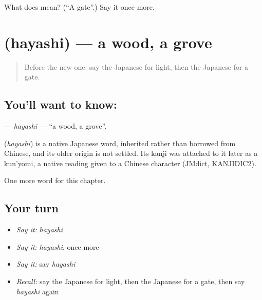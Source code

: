 \begin{tcolorbox}[breakable,colback=teal!4,colframe=teal!35!black,title={Before you move on}]
What does  mean? (\textquotedblleft{}A gate\textquotedblright{}.) Say it once more.
\end{tcolorbox}
\section[\texorpdfstring{\ja{はやし} (hayashi)}{はやし (hayashi)}]{ (hayashi) — a wood, a grove}

\label{lesson:JA-C106-hayashi}



\begin{quote}
Before the new one: say the Japanese for light, then the Japanese for a gate.
\end{quote}

\subsection*{You'll want to know: }
\textbf{} — \emph{hayashi} — \textquotedblleft{}a wood, a grove\textquotedblright{}.

\begin{cousinweb}
\textbf{} (\emph{hayashi}) is a native Japanese word, inherited rather than borrowed from Chinese, and its older origin is not settled. Its kanji was attached to it later as a kun'yomi, a native reading given to a Chinese character (JMdict, KANJIDIC2).
\end{cousinweb}

\begin{grammarlens}[title={What you've built}]
One more word for this chapter.
\end{grammarlens}

\subsection*{Your turn}
\begin{itemize}
\raggedright
  \item \emph{Say it:} \emph{hayashi}
  \item \emph{Say it:} \emph{hayashi}, once more
  \item \emph{Say it:} say \emph{hayashi}
  \item \emph{Recall:} say the Japanese for light, then the Japanese for a gate, then say \emph{hayashi} again
\end{itemize}

